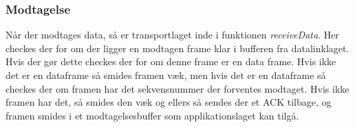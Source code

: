 \subsubsection{Modtagelse}
Når der modtages data, så er transportlaget inde i funktionen \textit{receiveData}. Her checkes der for om der ligger en modtagen frame klar i bufferen fra datalinklaget. Hvis der gør dette checkes der for om denne frame er en data frame. Hvis ikke det er en dataframe så smides framen væk, men hvis det er en dataframe så checkes der om framen har det sekvensnummer der forventes modtaget. Hvis ikke framen har det, så smides den væk og ellers så sendes der et ACK tilbage, og framen smides i et modtagelsesbuffer som applikationslaget kan tilgå.